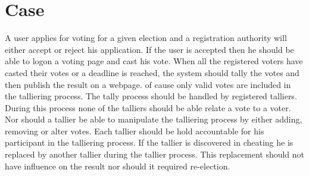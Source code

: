 \section{Case}
A user applies for voting for a given election and a registration authority will either accept or reject his application.  If the user is accepted then he should be able to logon a voting page and cast his vote.  When all the registered voters have casted their votes or a deadline is reached, the system should tally the votes and then publish the result on a webpage. of cause only valid votes are included in the talliering process. The tally process should be handled by registered talliers. During this process none of the talliers should be able relate a  vote to a voter. Nor should a tallier be able to manipulate the talliering process by either adding, removing or alter votes. Each tallier should be hold accountable for his participant in the talliering process. If the tallier is discovered in cheating he is replaced by another tallier during the tallier process. This replacement should not have influence on the result nor should it required re-election. 